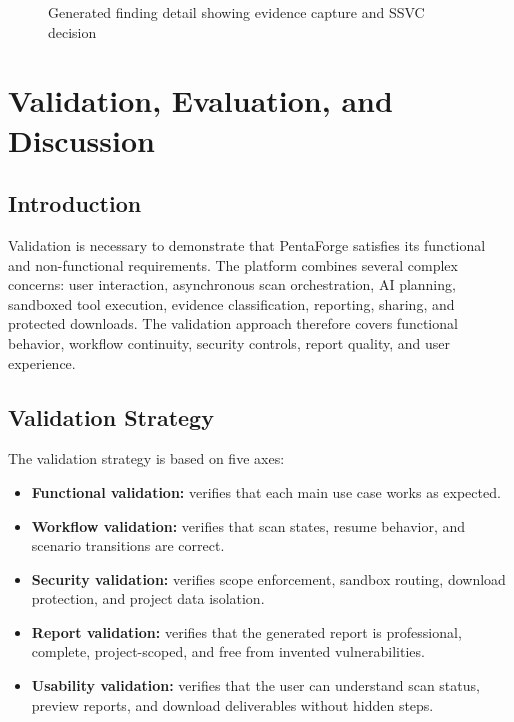 \documentclass[12pt,a4paper]{report}
\begin{document}
\begin{figure}[H]
    \centering
    \caption{Generated finding detail showing evidence capture and SSVC decision}
    \label{fig:ui_report}
\end{figure}

\section{Validation, Evaluation, and Discussion}

\subsection{Introduction}

Validation is necessary to demonstrate that PentaForge satisfies its functional and
non-functional requirements. The platform combines several complex concerns: user
interaction, asynchronous scan orchestration, AI planning, sandboxed tool execution,
evidence classification, reporting, sharing, and protected downloads. The validation
approach therefore covers functional behavior, workflow continuity, security controls,
report quality, and user experience.

\subsection{Validation Strategy}

The validation strategy is based on five axes:

\begin{itemize}
    \item \textbf{Functional validation:} verifies that each main use case works as
    expected.
    \item \textbf{Workflow validation:} verifies that scan states, resume behavior,
    and scenario transitions are correct.
    \item \textbf{Security validation:} verifies scope enforcement, sandbox routing,
    download protection, and project data isolation.
    \item \textbf{Report validation:} verifies that the generated report is
    professional, complete, project-scoped, and free from invented vulnerabilities.
    \item \textbf{Usability validation:} verifies that the user can understand scan
    status, preview reports, and download deliverables without hidden steps.
\end{itemize}
\end{document}

